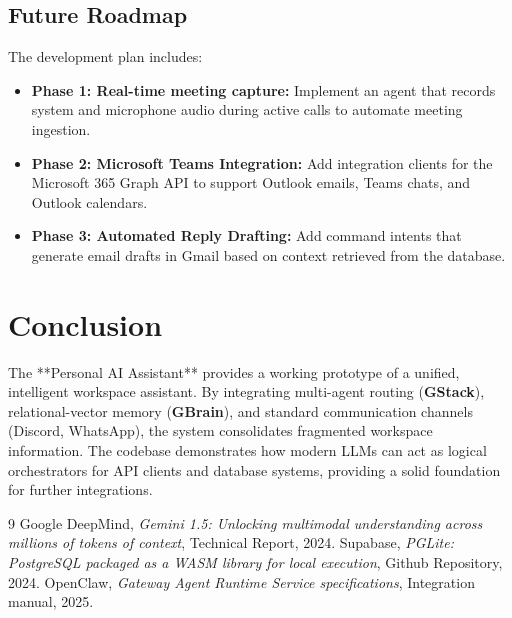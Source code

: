 \documentclass[12pt,a4paper]{report}
\begin{document}
\section{Future Roadmap}
The development plan includes:
\begin{itemize}
    \item \textbf{Phase 1: Real-time meeting capture:} Implement an agent that records system and microphone audio during active calls to automate meeting ingestion.
    \item \textbf{Phase 2: Microsoft Teams Integration:} Add integration clients for the Microsoft 365 Graph API to support Outlook emails, Teams chats, and Outlook calendars.
    \item \textbf{Phase 3: Automated Reply Drafting:} Add command intents that generate email drafts in Gmail based on context retrieved from the database.
\end{itemize}

\chapter{Conclusion}
The **Personal AI Assistant** provides a working prototype of a unified, intelligent workspace assistant. By integrating multi-agent routing (\textbf{GStack}), relational-vector memory (\textbf{GBrain}), and standard communication channels (Discord, WhatsApp), the system consolidates fragmented workspace information. The codebase demonstrates how modern LLMs can act as logical orchestrators for API clients and database systems, providing a solid foundation for further integrations.

\newpage
\begin{thebibliography}{9}
Google DeepMind, \emph{Gemini 1.5: Unlocking multimodal understanding across millions of tokens of context}, Technical Report, 2024.
Supabase, \emph{PGLite: PostgreSQL packaged as a WASM library for local execution}, Github Repository, 2024.
OpenClaw, \emph{Gateway Agent Runtime Service specifications}, Integration manual, 2025.
\end{thebibliography}
\end{document}
